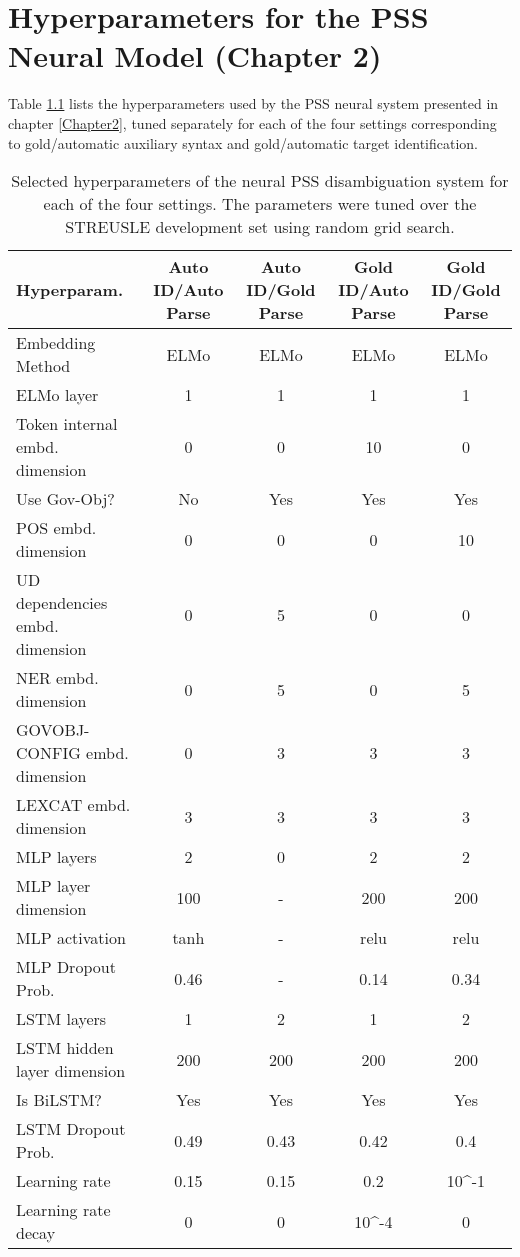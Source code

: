 
\chapter{Hyperparameters for the PSS Neural Model (Chapter 2)} %

\label{AppendixA} %

Table \ref{tab:hyperparams} lists the hyperparameters used by the
PSS neural system presented in chapter \ref{Chapter2}, tuned separately for each of the four settings corresponding to gold/automatic auxiliary syntax and gold/automatic target identification.

\begin{table}[]
  \small
	\centering
	\begin{tabular}{@{}l|cccc@{}}
		\toprule
		Hyperparam. & Auto ID/Auto Parse & Auto ID/Gold Parse & Gold ID/Auto Parse & Gold ID/Gold Parse\\
		\midrule
        Embedding Method & ELMo & ELMo & ELMo & ELMo \\
        ELMo layer & 1 & 1 & 1 & 1 \\
        Token internal embd. dimension & 0 & 0 & 10 & 0 \\
        Use Gov-Obj? & No & Yes & Yes & Yes \\
        POS embd. dimension  & 0 & 0 & 0 & 10 \\
        UD dependencies embd. dimension  & 0 & 5 & 0 & 0 \\
        NER  embd. dimension  & 0 & 5 & 0 & 5 \\
        GOVOBJ-CONFIG embd. dimension  & 0 & 3 & 3 & 3 \\
        LEXCAT embd. dimension  & 3 & 3 & 3 & 3 \\
        MLP layers  & 2 & 0 & 2 & 2 \\
        MLP layer dimension  & 100 & - & 200 & 200 \\
        MLP activation  & tanh & - & relu & relu \\
        MLP Dropout Prob.  & 0.46 & - & 0.14 & 0.34 \\
        LSTM layers  & 1 & 2 & 1 & 2 \\
        LSTM hidden layer dimension  & 200 & 200 & 200 & 200 \\
        Is BiLSTM? & Yes & Yes & Yes & Yes \\
        LSTM Dropout Prob.  & 0.49 & 0.43 & 0.42 & 0.4 \\
        Learning rate  & 0.15 & 0.15 & 0.2 & 10^{-1} \\
        Learning rate decay  & 0 & 0 & 10^{-4} & 0 \\
		\bottomrule
	\end{tabular}
	\caption{\label{tab:hyperparams}
        Selected hyperparameters of the neural PSS disambiguation system for each of the four settings. The parameters were tuned over the STREUSLE development set using random grid search.
	}

\end{table}
